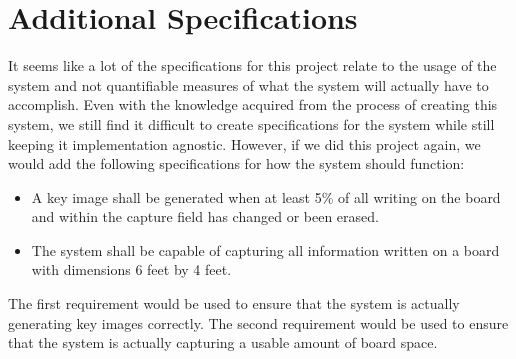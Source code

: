 \documentclass[]{article}
\begin{document}
	\section*{Additional Specifications}
		It seems like a lot of the specifications for this project relate to the usage of the system and not quantifiable measures of what the system will actually have to accomplish. Even with the knowledge acquired from the process of creating this system, we still find it difficult to create specifications for the system while still keeping it implementation agnostic. However, if we did this project again, we would add the following specifications for how the system should function:
		\begin{itemize}
			\item A key image shall be generated when at least 5\% of all writing on the board and within the capture field has changed or been erased.
			\item The system shall be capable of capturing all information written on a board with dimensions 6 feet by 4 feet.
		\end{itemize}
		The first requirement would be used to ensure that the system is actually generating key images correctly. The second requirement would be used to ensure that the system is actually capturing a usable amount of board space.
		
		
	
	
\end{document}
